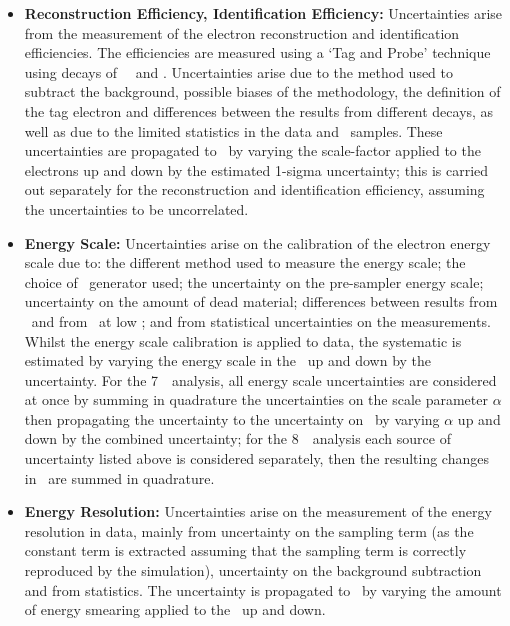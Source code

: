\begin{itemize}
     \item {\bf Reconstruction Efficiency, Identification Efficiency:}
     Uncertainties arise from the measurement of the electron reconstruction and
     identification efficiencies. The efficiencies are measured using a `Tag and
     Probe' technique using decays of \W\, \Z\ and \JPsi. Uncertainties arise
     due to the method used to subtract the background, possible biases of the
     methodology, the definition of the
     tag electron and differences between the results from different decays, as
     well as due to the limited statistics in the data and \mc\ samples. These
     uncertainties are propagated to \CZZ\ by varying the scale-factor applied
     to the electrons up and down by the estimated 1-sigma uncertainty; this is carried out
     separately for the reconstruction and identification efficiency, assuming
     the uncertainties to be uncorrelated.

    \item {\bf Energy Scale:}
    Uncertainties arise on the calibration of the electron energy scale due to: 
    the different method used to measure the energy scale; the
    choice of \mc\ generator used; the uncertainty on the pre-sampler energy 
    scale; uncertainty on the amount of dead material; differences between
    results from \Zee\ and from \JPsiee\ at low \et; and from statistical
    uncertainties on the measurements. Whilst the energy scale calibration is
    applied to data, the systematic is estimated by varying the energy scale in
    the \mc\ up and down by the uncertainty. For the 7~\tev\ analysis, all
    energy scale
    uncertainties are considered at once by summing in quadrature the
    uncertainties on the scale parameter $\alpha$ then propagating the
    uncertainty to the uncertainty on \CZZ\ by varying $\alpha$ up and down by
    the combined uncertainty; for the 8~\tev\ analysis each source of
    uncertainty listed above is considered separately, then the resulting
    changes in \CZZ\ are summed in quadrature.

    \item {\bf Energy Resolution:} Uncertainties arise on the measurement of the
    energy resolution in data, mainly from uncertainty on the sampling term (as the
    constant term is extracted assuming that the sampling term is correctly
    reproduced by the simulation), uncertainty on the background subtraction and
    from statistics. The uncertainty is propagated to \CZZ\ by varying the
    amount of energy smearing applied to the \mc\ up and down.


\end{itemize}

